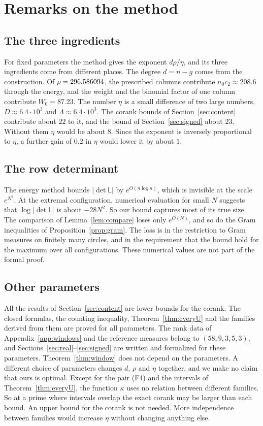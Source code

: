 \section{Remarks on the method}\label{sec:remarks}

\subsection{The three ingredients}
For fixed parameters the method gives the exponent $d\rho/\eta$, and its three ingredients come from
different places. The degree $d=n-g$ comes from the construction. Of $\rho=296.586094$, the prescribed columns
contribute $n_0c_2\approx208.6$ through the energy, and the weight and the binomial factor of one column
contribute $W_0=87.23$. The number $\eta$ is a small difference of two large numbers, $D\approx6.4\cdot10^3$ and
$\Lambda\approx6.4\cdot10^3$. The corank bounds of Section~\ref{sec:content} contribute about $22$ to it, and the
bound of Section~\ref{sec:signed} about $23$. Without them $\eta$ would be about $8$. Since the exponent
is inversely proportional to $\eta$, a further gain of $0.2$ in $\eta$ would lower it by about $1$.

\subsection{The row determinant}
\begin{remark}\label{rem:L}
The energy method bounds $|\det\mathsf L|$ by $e^{O(n\log n)}$, which is invisible at the scale $e^{N^2}$.
At the extremal configuration, numerical evaluation for small $N$ suggests that $\log|\det\mathsf L|$ is about
$-28N^2$. So our bound captures most of its true size. The comparison of Lemma~\ref{lem:compare} loses only
$e^{O(N)}$, and so do the Gram inequalities of Proposition~\ref{prop:gram}. The loss is in the restriction to
Gram measures on finitely many circles, and in the requirement that the bound hold for the maximum over
all configurations. These numerical values are not part of the formal proof.
\end{remark}

\subsection{Other parameters}
All the results of Section~\ref{sec:content} are lower bounds for the corank. The closed formulas, the
counting inequality, Theorem~\ref{thm:everyU} and the families derived from them are proved for all
parameters. The rank data of Appendix~\ref{app:windows} and the reference measures belong to $(58,9,3,5,3)$, and
Sections~\ref{sec:real}--\ref{sec:signed} are written and formalized for these parameters. Theorem~\ref{thm:window} does not depend on
the parameters. A different choice of parameters changes $d$, $\rho$ and $\eta$ together, and we make no claim
that ours is optimal. Except for the pair (F4) and the intervals of Theorem~\ref{thm:everyU}, the function
$\kappa$ uses no relation between different families. So at a prime where intervals overlap the exact corank
may be larger than each bound. An upper bound for the corank is not needed. More independence between
families would increase $\eta$ without changing anything else.

